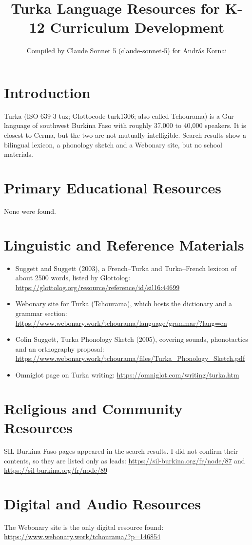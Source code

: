 \documentclass[12pt]{article}
\title{Turka Language Resources for K-12 Curriculum Development}
\author{Compiled by Claude Sonnet 5 (claude-sonnet-5) for Andr\'as Kornai}
\date{}
\begin{document}
\maketitle

\section{Introduction}
Turka (ISO 639-3 tuz; Glottocode turk1306; also called Tchourama) is a Gur language of southwest Burkina Faso with roughly 37,000 to 40,000 speakers. It is closest to Cerma, but the two are not mutually intelligible. Search results show a bilingual lexicon, a phonology sketch and a Webonary site, but no school materials.

\section{Primary Educational Resources}
None were found.

\section{Linguistic and Reference Materials}
\begin{itemize}
\item Suggett and Suggett (2003), a French--Turka and Turka--French lexicon of about 2500 words, listed by Glottolog: \url{https://glottolog.org/resource/reference/id/sil16:44699}
\item Webonary site for Turka (Tchourama), which hosts the dictionary and a grammar section: \url{https://www.webonary.work/tchourama/language/grammar/?lang=en}
\item Colin Suggett, Turka Phonology Sketch (2005), covering sounds, phonotactics and an orthography proposal: \url{https://www.webonary.work/tchourama/files/Turka_Phonology_Sketch.pdf}
\item Omniglot page on Turka writing: \url{https://omniglot.com/writing/turka.htm}
\end{itemize}

\section{Religious and Community Resources}
SIL Burkina Faso pages appeared in the search results. I did not confirm their contents, so they are listed only as leads: \url{https://sil-burkina.org/fr/node/87} and \url{https://sil-burkina.org/fr/node/89}

\section{Digital and Audio Resources}
The Webonary site is the only digital resource found: \url{https://www.webonary.work/tchourama/?p=146854}
\end{document}
